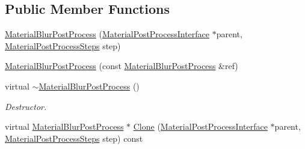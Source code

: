 \subsection*{Public Member Functions}
\begin{DoxyCompactItemize}
\item 
\mbox{\hyperlink{class_geometry_engine_1_1_custom_shading_1_1_material_blur_post_process_a1353d7855dd43ab08d3f68ab40e36dc0}{Material\+Blur\+Post\+Process}} (\mbox{\hyperlink{class_geometry_engine_1_1_custom_shading_1_1_material_post_process_interface}{Material\+Post\+Process\+Interface}} $\ast$parent, \mbox{\hyperlink{namespace_geometry_engine_1_1_custom_shading_af8b09b91ca7086f4f67a5d4181f35e58}{Material\+Post\+Process\+Steps}} step)
\item 
\mbox{\hyperlink{class_geometry_engine_1_1_custom_shading_1_1_material_blur_post_process_a5af24d3d39bcd22f85230471678faeaa}{Material\+Blur\+Post\+Process}} (const \mbox{\hyperlink{class_geometry_engine_1_1_custom_shading_1_1_material_blur_post_process}{Material\+Blur\+Post\+Process}} \&ref)
\item 
\mbox{\label{class_geometry_engine_1_1_custom_shading_1_1_material_blur_post_process_a88cf7f5ef14c103f453ea98aeb6bf4b4}} 
virtual \mbox{\hyperlink{class_geometry_engine_1_1_custom_shading_1_1_material_blur_post_process_a88cf7f5ef14c103f453ea98aeb6bf4b4}{$\sim$\+Material\+Blur\+Post\+Process}} ()
\begin{DoxyCompactList}\small\item\em Destructor. \end{DoxyCompactList}\item 
virtual \mbox{\hyperlink{class_geometry_engine_1_1_custom_shading_1_1_material_blur_post_process}{Material\+Blur\+Post\+Process}} $\ast$ \mbox{\hyperlink{class_geometry_engine_1_1_custom_shading_1_1_material_blur_post_process_ac0e7b317fc9e8e8da8f66eb295adad87}{Clone}} (\mbox{\hyperlink{class_geometry_engine_1_1_custom_shading_1_1_material_post_process_interface}{Material\+Post\+Process\+Interface}} $\ast$parent, \mbox{\hyperlink{namespace_geometry_engine_1_1_custom_shading_af8b09b91ca7086f4f67a5d4181f35e58}{Material\+Post\+Process\+Steps}} step) const
\item 
\mbox{\label{class_geometry_engine_1_1_custom_shading_1_1_material_blur_post_process_a9dcabc350a2c5d15dbff06be8290c420}} 

\end{DoxyCompactItemize}
